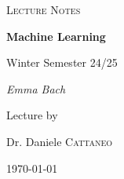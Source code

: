 \begin{titlepage}
	\centering
	{\Large \textsc{Lecture Notes}\par}
	\vspace{0.5cm}
	{\huge\bfseries Machine Learning\par}
	\vspace{1cm}
    {\Large Winter Semester 24/25\par}
    \vspace{1cm}
	{\Large\itshape Emma Bach\par}
	\vfill
	Lecture by\par
	Dr. Daniele \textsc{Cattaneo}

	\vfill

	{\large \today\par}
\end{titlepage}

